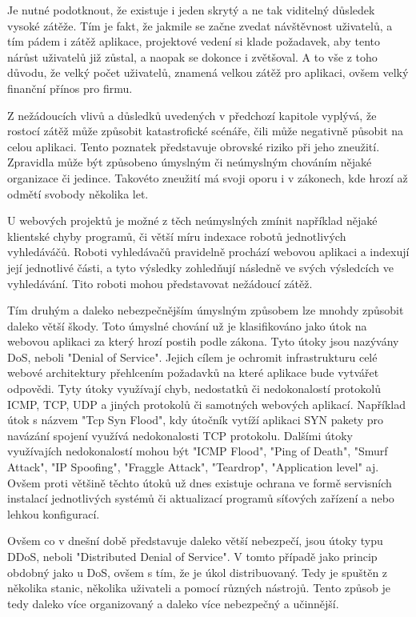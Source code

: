 \documentclass[12pt]{article}
\begin{document}
Je nutné podotknout, že existuje i jeden skrytý a ne tak viditelný důsledek vysoké zátěže. Tím je fakt, že jakmile se začne zvedat návštěvnost uživatelů, a tím pádem i zátěž aplikace, projektové vedení si klade požadavek, aby tento nárůst uživatelů již zůstal, a naopak se dokonce i zvětšoval. A to vše z toho důvodu, že velký počet uživatelů, znamená velkou zátěž pro aplikaci, ovšem velký finanční přínos pro firmu.



Z nežádoucích vlivů a důsledků uvedených v předchozí kapitole vyplývá, že rostocí zátěž může způsobit katastrofické scénáře, čili může negativně působit na celou aplikaci. Tento poznatek představuje obrovské riziko při jeho zneužití. Zpravidla může být způsobeno úmyslným či neúmyslným chováním nějaké organizace či jedince. Takovéto zneužití má svoji oporu i v zákonech, kde hrozí až odmětí svobody několika let.

U webových projektů je možné z těch neúmyslných zmínit například nějaké klientské chyby programů, či větší míru indexace robotů jednotlivých vyhledáváčů. Roboti vyhledávačů pravidelně prochází webovou aplikaci a indexují její jednotlivé části, a tyto výsledky zohledňují následně ve svých výsledcích ve vyhledávání. Tito roboti mohou představovat nežádoucí zátěž.

Tím druhým a daleko nebezpečnějším úmyslným způsobem lze mnohdy způsobit daleko větší škody. Toto úmyslné chování už je klasifikováno jako útok na webovou aplikaci za který hrozí postih podle zákona. Tyto útoky jsou nazývány DoS, neboli "Denial of Service". Jejich cílem je ochromit infrastrukturu celé webové architektury přehlcením požadavků na které aplikace bude vytvářet odpovědi. Tyty útoky využívají chyb, nedostatků či nedokonalostí protokolů ICMP, TCP, UDP a jiných protokolů či samotných webových aplikací. Například útok s názvem "Tcp Syn Flood", kdy útočník vytíží aplikaci SYN pakety pro navázání spojení využívá nedokonalosti TCP protokolu. Dalšími útoky využívajích nedokonalostí mohou být "ICMP Flood", "Ping of Death", "Smurf Attack", "IP Spoofing", "Fraggle Attack", "Teardrop", "Application level" aj. Ovšem proti většině těchto útoků už dnes existuje ochrana ve formě servisních instalací jednotlivých systémů či aktualizací programů síťových zařízení a nebo lehkou konfigurací. \cite{dos}

Ovšem co v dnešní době představuje daleko větší nebezpečí, jsou útoky typu DDoS, neboli "Distributed Denial of Service". V tomto případě jako princip obdobný jako u DoS, ovšem s tím, že je úkol distribuovaný. Tedy je spuštěn z několika stanic, několika uživateli a pomocí různých nástrojů. Tento způsob je tedy daleko více organizovaný a daleko více nebezpečný a učinnější. \cite{dos}
\end{document}
